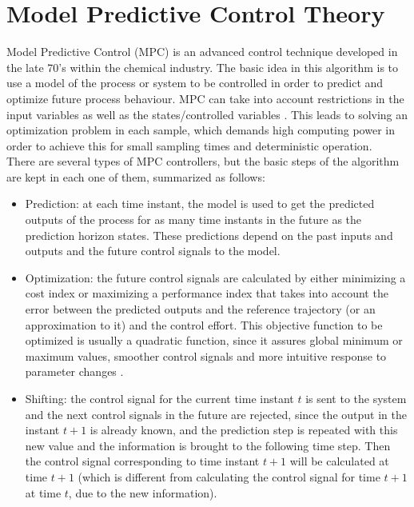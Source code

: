 \section{Model Predictive Control Theory} %

Model Predictive Control (MPC) is an advanced control technique developed in the late 70’s within the chemical industry. The basic idea in this algorithm is to use a model of the process or system to be controlled in order to predict and optimize future process behaviour. MPC can take into account restrictions in the input variables as well as the states/controlled variables \cite{Hovd}. This leads to solving an optimization problem in each sample, which demands high computing power in order to achieve this for small sampling times and deterministic operation.\\ 

There are several types of MPC controllers, but the basic steps of the algorithm are kept in each one of them, summarized as follows:

\begin{itemize}

\item Prediction: at each time instant, the model is used to get the predicted outputs of the process for as many time instants in the future as the prediction horizon states. These predictions depend on the past inputs and outputs and the future control signals to the model.

\item Optimization: the future control signals are calculated by either minimizing a cost index or maximizing a performance index that takes into account the error between the predicted outputs and the reference trajectory (or an approximation to it) and the control effort. This objective function to be optimized is usually a quadratic function, since it assures global minimum or maximum values, smoother control signals and more intuitive response to parameter changes \cite{Hovd}.

\item Shifting: the control signal for the current time instant $t$ is sent to the system and the next control signals in the future are rejected, since the output in the instant $t + 1$ is already known, and the prediction step is repeated with this new value and the information is brought to the following time step. Then the control signal corresponding to time instant    $t + 1$ will be calculated at time $t + 1$ (which is different from calculating the control signal for time $t + 1$ at time $t$, due to the new information).

\end{itemize}

